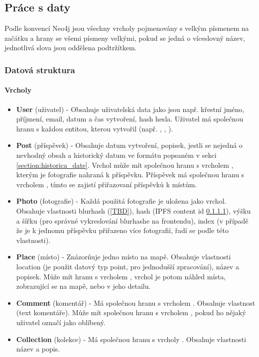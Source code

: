 \documentclass[12pt, a4paper,
 twoside,        %
 openright
]{report}
\begin{document}
    \subsection{Práce s daty}
        Podle konvencí Neo4j jsou všechny vrcholy pojmenovány s velkým písmenem na začátku a hrany se všemi písmeny velkými, pokud se jedná o víceslovný název, jednotlivá slova jsou oddělena podtržítkem.
        \subsubsection{Datová struktura}
            \paragraph{Vrcholy}
                \begin{itemize}
    	            \item \textbf{User} (uživatel) - Obsahuje uživatelská data jako jsou např. křestní jméno, příjmení, email, datum a čas vytvoření, hash hesla. Uživatel má společnou hranu  s každou entitou, kterou vytvořil (např. , , ).
    	            \item \textbf{Post} (příspěvek) - Obsahuje datum vytvoření, popisek, jestli se nejedná o nevhodný obsah a historický datum ve formátu popsaném v sekci \ref{section:historica_date}. Vrchol  může mít společnou hranu  s vrcholem , kterým je fotografie nahraná k příspěvku. Příspěvek má společnou hranu  s vrcholem , tímto se zajistí přiřazovaní příspěvků k místům.
    	            \item \textbf{Photo} (fotografie) - Každá použitá fotografie je uložena jako vrchol. Obsahuje vlastnosti blurhash (\ref{TBD}), hash (IPFS content id \ref{}), výšku a šířku (pro správné vykreslování blurhashe na frontendu), index (v případě že je k jednomu příspěvku přiřazeno více fotografií, řadí se podle této vlastnosti).
    	            \item \textbf{Place} (místo) - Znázorňuje jedno místo na mapě. Obsahuje vlastnosti location (je použit datový typ point, pro jednodušší zpracování), název a popisek. Může mít hranu  s vrcholem , vrchol  je potom náhled místa, zobrazující se na mapě, nebo v jeho detailu.
    	            \item \textbf{Comment} (komentář) - Má společnou hranu  s vrcholem . Obsahuje vlastnost  (text komentáře). Může mít společnou hranu  s vrcholem , pokud ho nějaký uživatel označí jako oblíbený.
    	            \item \textbf{Collection} (kolekce) - Má společnou hranu  s vrcholy . Obsahuje vlastnosti název a popis.
            	\end{itemize}
\end{document}
